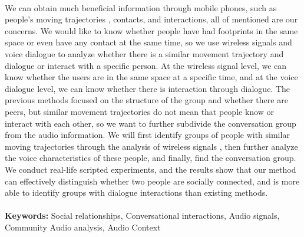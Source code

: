 \documentclass[a4paper,12pt]{report}
\begin{document}
\begin{titlepage}
    \paragraph{}
    We can obtain much beneficial information through mobile phones, such as people's moving trajectories \cite{lai2021viwise} , contacts, and interactions, all of mentioned are our concerns. We would like to know whether people have had footprints in the same space or even have any contact at the same time, so we use wireless signals and voice dialogue to analyze whether there is a similar movement trajectory and dialogue or interact with a specific person. At the wireless signal level, we can know whether the users are in the same space at a specific time, and at the voice dialogue level, we can know whether there is interaction through dialogue. The previous methods \cite{liu2019social} \cite{guo2019social} \cite{tao2019audio} focused on the structure of the group and whether there are peers, but similar movement trajectories do not mean that people know or interact with each other, so we want to further subdivide the conversation group from the audio information. We will first identify groups of people with similar moving trajectories through the analysis of wireless signals \cite{chen2019witrack}, then further analyze the voice characteristics of these people, and finally, find the conversation group. 
    We conduct real-life scripted experiments, and the results show that our method can effectively distinguish whether two people are socially connected, and is more able to identify groups with dialogue interactions than existing methods\cite{baker2017next2me}.
    \\ 
    \\
    \textbf{Keywords:} {Social relationships, Conversational interactions, Audio signals, Community Audio analysis, Audio Context}
\end{titlepage}
\end{document}
